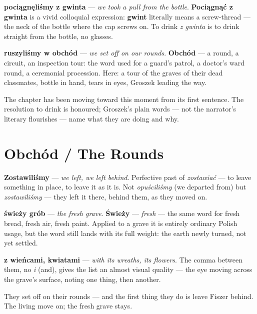 \textbf{pociągnęliśmy z gwinta} --- \textit{we took a pull from the
bottle}. \textbf{Pociągnąć z gwinta} is a vivid colloquial expression:
\textbf{gwint} literally means a screw-thread --- the neck of the
bottle where the cap screws on. To drink \textit{z gwinta} is to drink
straight from the bottle, no glasses.

\textbf{ruszyliśmy w obchód} --- \textit{we set off on our rounds}.
\textbf{Obchód} --- a round, a circuit, an inspection tour: the word
used for a guard's patrol, a doctor's ward round, a ceremonial
procession. Here: a tour of the graves of their dead classmates, bottle
in hand, tears in eyes, Groszek leading the way.

The chapter has been moving toward this moment from its first sentence.
The resolution to drink is honoured; Groszek's plain words --- not the
narrator's literary flourishes --- name what they are doing and why.

\section{Obchód / The Rounds}


\textbf{Zostawiliśmy} --- \textit{we left, we left behind}. Perfective
past of \textit{zostawiać} --- to leave something in place, to leave
it as it is. Not \textit{opuściliśmy} (we departed from) but
\textit{zostawiliśmy} --- they left it there, behind them, as they
moved on.

\textbf{świeży grób} --- \textit{the fresh grave}. \textbf{Świeży}
--- \textit{fresh} --- the same word for fresh bread, fresh air,
fresh paint. Applied to a grave it is entirely ordinary Polish usage,
but the word still lands with its full weight: the earth newly turned,
not yet settled.

\textbf{z wieńcami, kwiatami} --- \textit{with its wreaths, its
flowers}. The comma between them, no \textit{i} (and), gives the list
an almost visual quality --- the eye moving across the grave's surface,
noting one thing, then another.

They set off on their rounds --- and the first thing they do is leave
Fiszer behind. The living move on; the fresh grave stays.


